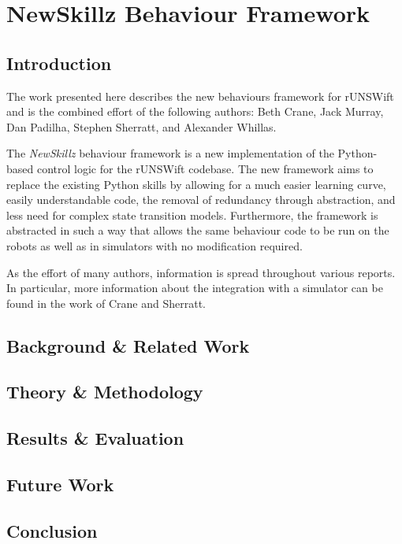 \chapter{NewSkillz Behaviour Framework}
\label{chap:rl}

\section{Introduction}
The work presented here describes the new behaviours framework for rUNSWift and is the combined effort of the following authors: Beth Crane, Jack Murray, Dan Padilha, Stephen Sherratt, and Alexander Whillas.

The \textit{NewSkillz} behaviour framework is a new implementation of the Python-based control logic for the rUNSWift codebase. The new framework aims to replace the existing Python skills by allowing for a much easier learning curve, easily understandable code, the removal of redundancy through abstraction, and less need for complex state transition models. Furthermore, the framework is abstracted in such a way that allows the same behaviour code to be run on the robots as well as in simulators with no modification required.

As the effort of many authors, information is spread throughout various reports. In particular, more information about the integration with a simulator can be found in the work of Crane and Sherratt.\cite{simulator}

\section{Background \& Related Work}
\section{Theory \& Methodology}
\section{Results \& Evaluation}
\section{Future Work}
\section{Conclusion}
